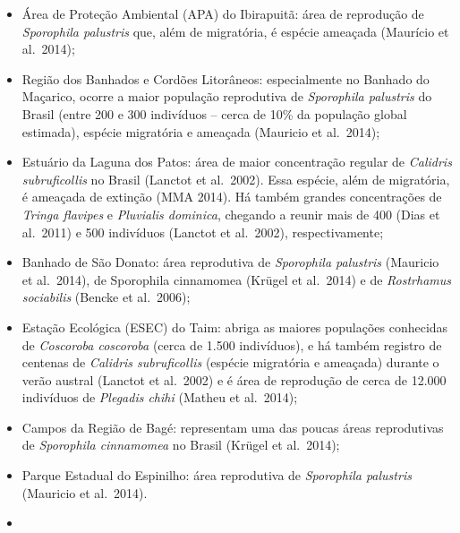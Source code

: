 \documentclass[
]{scrbook}
\begin{document}
\begin{itemize}
\item
  Área de Proteção Ambiental (APA) do Ibirapuitã: área de reprodução de \emph{Sporophila palustris} que, além de migratória, é espécie ameaçada (Maurício et al.~2014);
\item
  Região dos Banhados e Cordões Litorâneos: especialmente no Banhado do Maçarico, ocorre a maior população reprodutiva de \emph{Sporophila palustris} do Brasil (entre 200 e 300 indivíduos -- cerca de 10\% da população global estimada), espécie migratória e ameaçada (Mauricio et al.~2014);
\item
  Estuário da Laguna dos Patos: área de maior concentração regular de \emph{Calidris subruficollis} no Brasil (Lanctot et al.~2002). Essa espécie, além de migratória, é ameaçada de extinção (MMA 2014). Há também grandes concentrações de \emph{Tringa flavipes} e \emph{Pluvialis dominica}, chegando a reunir mais de 400 (Dias et al.~2011) e 500 indivíduos (Lanctot et al.~2002), respectivamente;
\item
  Banhado de São Donato: área reprodutiva de \emph{Sporophila palustris} (Mauricio et al.~2014), de Sporophila cinnamomea (Krügel et al.~2014) e de \emph{Rostrhamus sociabilis} (Bencke et al.~2006);
\item
  Estação Ecológica (ESEC) do Taim: abriga as maiores populações conhecidas de \emph{Coscoroba coscoroba} (cerca de 1.500 indivíduos), e há também registro de centenas de \emph{Calidris subruficollis} (espécie migratória e ameaçada) durante o verão austral (Lanctot et al.~2002) e é área de reprodução de cerca de 12.000 indivíduos de \emph{Plegadis chihi} (Matheu et al.~2014);
\item
  Campos da Região de Bagé: representam uma das poucas áreas reprodutivas de \emph{Sporophila cinnamomea} no Brasil (Krügel et al.~2014);
\item
  Parque Estadual do Espinilho: área reprodutiva de \emph{Sporophila palustris} (Mauricio et al.~2014).
\item

\end{itemize}
\end{document}
